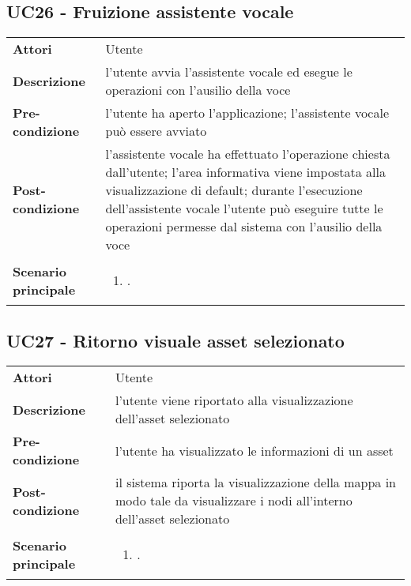 \subsection{UC26 - Fruizione assistente vocale} 
\label{sssec:UC26} 
\def\arraystretch{1.5}
\begin{tabularx}{\textwidth}{l|p{}}
	\rowcolor{I} \multicolumn{2}{c}{\color{white}\textbf{UC26 - Avvio assistente vocale}} \\
	\toprule
	\endhead
	\textbf{Attori} & Utente\\
	\textbf{Descrizione} & l'utente avvia l'assistente vocale ed esegue le operazioni con l'ausilio della voce\\
	\textbf{Pre-condizione} & l'utente ha aperto l'applicazione; l'assistente vocale può essere avviato\\
	\textbf{Post-condizione} & l'assistente vocale ha effettuato l'operazione chiesta dall'utente; l'area informativa viene impostata alla visualizzazione di default; durante l'esecuzione dell'assistente vocale l'utente può eseguire tutte le operazioni permesse dal sistema con l'ausilio della voce\\
	\textbf{Scenario principale} & \vspace{-1.2em}\begin{enumerate}[leftmargin=*,noitemsep,nosep]
		\item \nameref{sssec:UC26}.
	\end{enumerate}\\
	\bottomrule
\end{tabularx}
\subsection{UC27 - Ritorno visuale asset selezionato} 
\label{sssec:UC27} 
\def\arraystretch{1.5}
\begin{tabularx}{\textwidth}{l|p{}}
	\rowcolor{I} \multicolumn{2}{c}{\color{white}\textbf{UC27 - Ritorno visuale asset selezionato}} \\
	\toprule
	\endhead
	\textbf{Attori} & Utente\\
	\textbf{Descrizione} & l'utente viene riportato alla visualizzazione dell'asset selezionato\\
	\textbf{Pre-condizione} & l'utente ha visualizzato le informazioni di un asset\\
	\textbf{Post-condizione} & il sistema riporta la visualizzazione della mappa in modo tale da visualizzare i nodi all'interno dell'asset selezionato\\
	\textbf{Scenario principale} & \vspace{-1.2em}\begin{enumerate}[leftmargin=*,noitemsep,nosep]
		\item \nameref{sssec:UC27}.
	\end{enumerate}\\
	\bottomrule
\end{tabularx}
